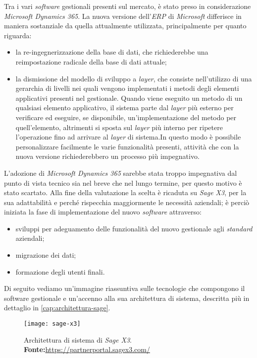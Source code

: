 Tra i vari \textit{software} gestionali presenti sul mercato, è stato preso in considerazione \textit{Microsoft Dynamics 365}. La nuova versione dell'\textit{ERP} di \textit{Microsoft} differisce in maniera sostanziale da quella attualmente utilizzata, principalmente per quanto riguarda:
\begin{itemize}
	\item la re-ingegnerizzazione della base di dati, che richiederebbe una reimpostazione radicale della base di dati attuale;
	\item la dismissione del modello di sviluppo a \textit{layer}, che consiste nell'utilizzo di una gerarchia di livelli nei quali vengono implementati i metodi degli elementi applicativi presenti nel gestionale. Quando viene eseguito un metodo di un qualsiasi elemento applicativo, il sistema parte dal \textit{layer} più esterno per verificare ed eseguire, se disponibile, un'implementazione del metodo per quell'elemento, altrimenti si sposta sul \textit{layer} più interno per ripetere l'operazione fino ad arrivare al \textit{layer} di sistema.In questo modo è possibile personalizzare facilmente le varie funzionalità presenti, attività che con la nuova versione richiederebbero un processo più impegnativo.
\end{itemize}
L'adozione di \textit{Microsoft Dynamics 365} sarebbe stata troppo impegnativa dal punto di vista tecnico sia nel breve che nel lungo termine, per questo motivo è stato scartato.
Alla fine della valutazione la scelta è ricaduta su \textit{Sage X3}, per la sua adattabilità e perché rispecchia maggiormente le necessità aziendali; è perciò iniziata la fase di implementazione del nuovo \textit{software} attraverso:

\begin{itemize}
	\item sviluppi per adeguamento delle funzionalità del nuovo gestionale agli\textit{ standard} aziendali;
	\item migrazione dei dati;
	\item formazione degli utenti finali.
\end{itemize}

Di seguito vediamo un'immagine riassuntiva sulle tecnologie che compongono il software gestionale e un'accenno alla sua architettura di sistema, descritta più in dettaglio in \ref{cap:architettura-sage}.

\vspace{10pt}
\begin{figure}[htbp]
	\begin{center}
		\texttt{[image: sage-x3]}
		\caption{Architettura di sistema di \textit{Sage X3}. \newline \textbf{Fonte:}\url{https://partnerportal.sagex3.com/}}
	\end{center}
\end{figure}
\vspace{30pt}


